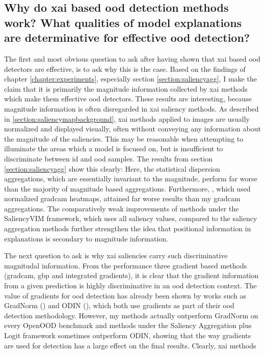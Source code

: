 \documentclass[UKenglish]{uiomasterthesis} %
\theoremstyle{definition}
\begin{document}
\subsection{Why do \ac{xai} based \ac{ood} detection methods work? What qualities of model explanations are determinative for effective \ac{ood} detection?}

The first and most obvious question to ask after having shown that \ac{xai} based \ac{ood} detectors are effective, is to ask why this is the case. Based on the findings of chapter \ref{chapter:experiments}, especially section \ref{section:saliencyagg}, I make the claim that it is primarily the magnitude information collected by \ac{xai} methods which make them effective \ac{ood} detectors. These results are interesting, because magnitude information is often disregarded in \ac{xai} saliency methods. As described in \ref{section:saliencymapbackground}, \ac{xai} methods applied to images are usually normalized and displayed visually, often without conveying any information about the magnitude of the saliencies. This may be reasonable when attempting to illuminate the areas which a model is focused on, but is insufficient to discriminate between \ac{id} and \ac{ood} samples. The results from section \ref{section:saliencyagg} show this clearly: Here, the statistical dispersion aggregations, which are essentially invariant to the magnitude, perform far worse than the majority of magnitude based aggregations. Furthermore, \cite{martinez}, which used normalized \ac{gradcam} heatmaps, attained far worse results than my \ac{gradcam} aggregations. The comparatively weak improvements of methods under the SaliencyVIM framework, which uses all saliency values, compared to the saliency aggregation methods further strengthen the idea that positional information in explanations is secondary to magnitude information.

The next question to ask is why \ac{xai} saliencies carry such discriminative magnitudal information. From the performance three gradient based methods (\ac{gradcam}, \ac{gbp} and integrated gradients), it is clear that the gradient information from a given prediction is highly discriminative in an \ac{ood} detection context. The value of gradients for \ac{ood} detection has already been shown by works such as GradNorm (\cite{gradnorm}) and ODIN (\cite{odin}), which both use gradients as part of their \ac{ood} detection methodology. However, my methods actually outperform GradNorm on every OpenOOD benchmark and methods under the Saliency Aggregation plus Logit framework sometimes outperform ODIN, showing that the way gradients are used for detection has a large effect on the final results. Clearly, \ac{xai} methods
\end{document}
